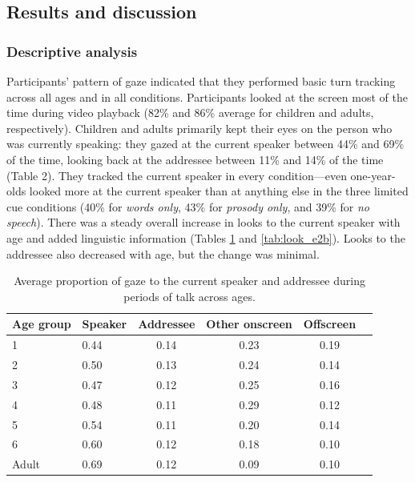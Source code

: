 \documentclass[authoryear, 12pt]{elsarticle}
\begin{document}
\subsection{Results and discussion}
\label{sec:results2}

\subsubsection{Descriptive analysis}
Participants' pattern of gaze indicated that they performed basic turn tracking across all ages and in all conditions. Participants looked at the screen most of the time during video playback (82\% and 86\% average for children and adults, respectively). Children and adults primarily kept their eyes on the person who was currently speaking: they gazed at the current speaker between 44\% and 69\% of the time, looking back at the addressee between 11\% and 14\% of the time (Table 2). They tracked the current speaker in every condition---even one-year-olds looked more at the current speaker than at anything else in the three limited cue conditions (40\% for \textit{words only}, 43\% for \textit{prosody only}, and 39\% for \textit{no speech}). There was a steady overall increase in looks to the current speaker with age and added linguistic information (Tables \ref{tab:look_e2} and \ref{tab:look_e2b}). Looks to the addressee also decreased with age, but the change was minimal. 

\begin{table}[t]
\begin{center}
  \begin{tabular}{llcccc}
    \hline
    Age group & Speaker & Addressee & Other onscreen & Offscreen\\ 
    \hline
    1 & 0.44 & 0.14 & 0.23 & 0.19 \\ 
    2 & 0.50 & 0.13 & 0.24 & 0.14 \\ 
    3 & 0.47 & 0.12 & 0.25 & 0.16 \\ 
    4 & 0.48 & 0.11 & 0.29 & 0.12 \\ 
    5 & 0.54 & 0.11 & 0.20 & 0.14 \\ 
    6 & 0.60 & 0.12 & 0.18 & 0.10 \\
    Adult & 0.69 & 0.12 & 0.09 & 0.10 \\
    \hline
  \end{tabular}
\end{center}
  \caption{Average proportion of gaze to the current speaker and addressee during periods of talk across ages.}
\label{tab:look_e2}
\end{table}
\end{document}
